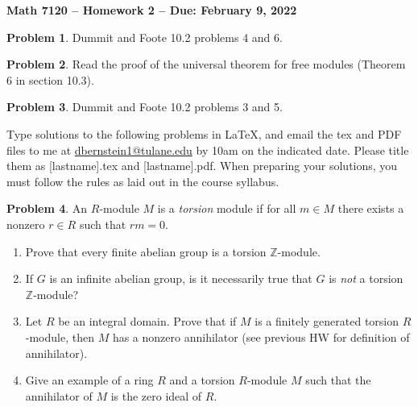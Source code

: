 \documentclass[letterpaper,11pt]{amsart}
\theoremstyle{plain}
\theoremstyle{definition}
\newtheorem{pr}{Problem}
\theoremstyle{remark}
\begin{document}
\Large

\begin{center}
{\bf Math 7120 -- Homework  2 --  Due:  February 9, 2022}
\end{center}

\normalsize

\medskip


\begin{pr}
    Dummit and Foote 10.2 problems 4 and 6.
\end{pr}

\begin{pr}
    Read the proof of the universal theorem for free modules (Theorem 6 in section 10.3).
\end{pr}


\begin{pr}
    Dummit and Foote 10.2 problems 3 and 5.
\end{pr}


\bigskip

Type solutions to the following problems in \LaTeX, and email the tex and PDF files to me at \url{dbernstein1@tulane.edu} by 10am on the indicated date.
Please title them as [lastname].tex and [lastname].pdf.
When preparing your solutions, you must follow the rules as laid out in the course syllabus.

\vspace{.5cm}



\begin{pr}
    An $R$-module $M$ is a \emph{torsion} module if for all $m\in M$ there exists a nonzero $r \in R$ such that $rm = 0$.
    \begin{enumerate}
        \item Prove that every finite abelian group is a torsion $\mathbb{Z}$-module.
        \item If $G$ is an infinite abelian group, is it necessarily true that $G$ is \emph{not} a torsion $\mathbb{Z}$-module?
        \item Let $R$ be an integral domain. Prove that if $M$ is a finitely generated torsion $R$-module, then $M$ has a nonzero annihilator (see previous HW for definition of annihilator).
        \item Give an example of a ring $R$ and a torsion $R$-module $M$ such that the annihilator of $M$ is the zero ideal of $R$.
    \end{enumerate}
\end{pr}
\end{document}
